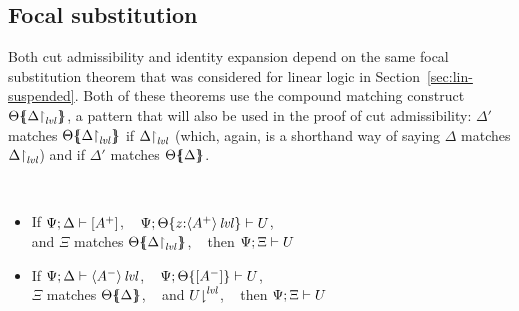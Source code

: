 \subsection{Focal substitution}

Both cut admissibility and identity expansion depend on the same
focal substitution theorem that was considered for linear logic in 
Section~\ref{sec:lin-suspended}. Both of these theorems use the
compound matching construct ${\Theta}\mbox{$\{\hspace{-4pt}\{$}{\ensuremath{{\Delta}{\upharpoonright}_{{\it lvl}}}}\mbox{$\}\hspace{-4pt}\}$}$,
a pattern that will also be used in the proof of cut admissibility: 
$\Delta'$ matches ${\Theta}\mbox{$\{\hspace{-4pt}\{$}{\ensuremath{{\Delta}{\upharpoonright}_{{\it lvl}}}}\mbox{$\}\hspace{-4pt}\}$}$
if ${\Delta}{\upharpoonright}_{{\it lvl}}$ (which, again, is a shorthand way of 
saying $\Delta$ matches ${\Delta}{\upharpoonright}_{{\it lvl}}$) and if
$\Delta'$ matches ${\Theta}\mbox{$\{\hspace{-4pt}\{$}{\Delta}\mbox{$\}\hspace{-4pt}\}$}$.

\bigskip
\begin{theorem}~
\begin{itemize}
\item If ${\Psi};{\Delta} \vdash {[A^+]} \mathstrut$, ~
      ${\Psi};{{\Theta}\{{z{:}{\langle {A^+} \rangle}\,{{\it lvl}}}\}} \vdash {U} \mathstrut$,\\
      and $\Xi$ matches ${\Theta}\mbox{$\{\hspace{-4pt}\{$}{\ensuremath{{\Delta}{\upharpoonright}_{{\it lvl}}}}\mbox{$\}\hspace{-4pt}\}$}$, ~
      then ${\Psi};{\Xi} \vdash {U} \mathstrut$
\item If ${\Psi};{\Delta} \vdash {{\langle {A^-} \rangle}\,{{\it lvl}}} \mathstrut$, ~
      ${\Psi};{{\Theta}\{{[A^-]}\}} \vdash {U} \mathstrut$, \\
      $\Xi$ matches ${\Theta}\mbox{$\{\hspace{-4pt}\{$}{\Delta}\mbox{$\}\hspace{-4pt}\}$}$, ~
      and ${U}{\downharpoonright}^{{\it lvl}}$, ~
      then ${\Psi};{\Xi} \vdash {U} \mathstrut$
\end{itemize}
\end{theorem}

